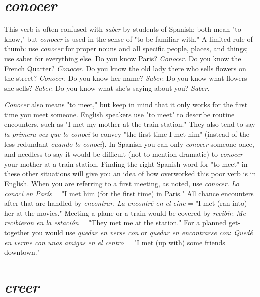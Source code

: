 \documentclass[14pt,a4paper,oneside]{memoir}
\begin{document}
\section{\emph{conocer}}

This verb is often confused with \emph{saber} by students of Spanish;
both mean "to know," but \emph{conocer} is used in the sense of "to be familiar with." A limited rule of thumb: use \emph{conocer} for proper nouns and
all specific people, places, and things; use saber for everything else. Do
you know Paris? \emph{Conocer}. Do you know the French Quarter? \emph{Conocer}.
Do you know the old lady there who sells flowers on the street? \emph{Conocer}. Do you know her name? \emph{Saber}. Do you know what flowers she
sells? \emph{Saber}. Do you know what she's saying about you? \emph{Saber}.

\emph{Conocer} also means "to meet," but keep in mind that it only
works for the first time you meet someone. English speakers use "to
meet" to describe routine encounters, such as "I met my mother at
the train station." They also tend to say \emph{la primera vez que lo conocí}
to convey "the first time I met him" (instead of the less redundant
\emph{cuando lo conocí}). In Spanish you can only \emph{conocer} someone once, and
needless to say it would be difficult (not to mention dramatic) to \emph{conocer} your mother at a train station. Finding the right Spanish word for
"to meet" in these other situations will give you an idea of how overworked this poor verb is in English. When you are referring to a first
meeting, as noted, use \emph{conocer}. \emph{Lo conocí en París} = "I met him (for
the first time) in Paris." All chance encounters after that are handled
by \emph{encontrar}. \emph{La encontré en el cine} = "I met (ran into) her at the
movies." Meeting a plane or a train would be covered by \emph{recibir}. \emph{Me
	recibieron en la estación} = "They met me at the station." For a
planned get-together you would use \emph{quedar en verse con} or \emph{quedar en
	encontrarse con}: \emph{Quedé en verme con unas amigas en el centro} = "I
met (up with) some friends downtown."

\section{\emph{creer}}
\end{document}
